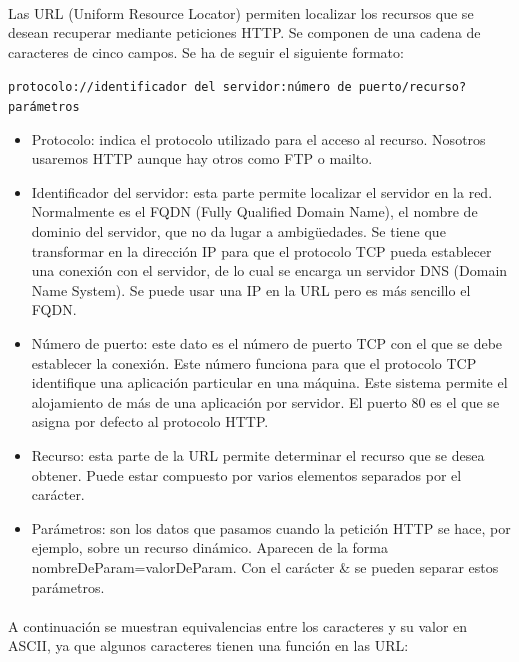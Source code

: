 \documentclass{article}
\begin{document}
	\paragraph{}Las URL (Uniform Resource Locator) permiten localizar los recursos que se desean recuperar mediante peticiones HTTP. Se componen de una cadena de caracteres de cinco campos. Se ha de seguir el siguiente formato:
	
	\begin{center}
			\texttt{protocolo://identificador del servidor:número de puerto/recurso?parámetros}
	\end{center}
	
	\begin{itemize}
		\item Protocolo: indica el protocolo utilizado para el acceso al recurso. Nosotros usaremos HTTP aunque hay otros como FTP o mailto.
		\item Identificador del servidor: esta parte permite localizar el servidor en la red. Normalmente es el FQDN (Fully Qualified Domain Name), el nombre de dominio del servidor, que no da lugar a ambigüedades. Se tiene que transformar en la dirección IP para que el protocolo TCP pueda establecer una conexión con el servidor, de lo cual se encarga un servidor DNS (Domain Name System). Se puede usar una IP en la URL pero es más sencillo el FQDN.
		\item Número de puerto: este dato es el número de puerto TCP con el que se debe establecer la conexión. Este número funciona para que el protocolo TCP identifique una aplicación particular en una máquina. Este sistema permite el alojamiento de más de una aplicación por servidor. El puerto 80 es el que se asigna por defecto al protocolo HTTP.
		\item Recurso: esta parte de la URL permite determinar el recurso que se desea obtener. Puede estar compuesto por varios elementos separados por el carácter.
		\item Parámetros: son los datos que pasamos cuando la petición HTTP se hace, por ejemplo, sobre un recurso dinámico. Aparecen de la forma nombreDeParam=valorDeParam. Con el carácter \& se pueden separar estos parámetros.
	\end{itemize}
	
	\paragraph{}A continuación se muestran equivalencias entre los caracteres y su valor en ASCII, ya que algunos caracteres tienen una función en las URL:
	
\end{document}
